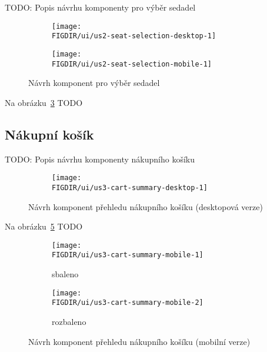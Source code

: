 TODO: Popis návrhu komponenty pro výběr sedadel

\begin{figure}[H]
    \centering
    \begin{subfigure}{0.775\textwidth}
        \texttt{[image: \\FIGDIR/ui/us2-seat-selection-desktop-1]}
        \label{fig:us2-seat-selection-desktop-1}
    \end{subfigure}
    \begin{subfigure}{0.2\textwidth}
        \texttt{[image: \\FIGDIR/ui/us2-seat-selection-mobile-1]}
        \label{fig:us2-seat-selection-mobile-1}
    \end{subfigure}
    \caption{Návrh komponent pro výběr sedadel}
    \label{fig:us2-seat-selection}
\end{figure}

Na obrázku~\ref{fig:us2-seat-selection} TODO

\subsection{Nákupní košík}
\label{subsec:narvh-ui-transformace-uzivatelskych-pribehu-nakupni-kosik}
\userstoryshoppingcart

TODO: Popis návrhu komponenty nákupního košíku

\begin{figure}[H]
    \centering
    \begin{subfigure}{\textwidth}
        \texttt{[image: \\FIGDIR/ui/us3-cart-summary-desktop-1]}
        \label{fig:uus3-cart-summary-desktop-1}
    \end{subfigure}
    \caption{Návrh komponent přehledu nákupního košíku (desktopová verze)}
    \label{fig:us3-cart-summary-desktop}
\end{figure}

Na obrázku~\ref{fig:us3-cart-summary-desktop} TODO

\begin{figure}[H]
    \centering
    \begin{subfigure}{0.4\textwidth}
        \texttt{[image: \\FIGDIR/ui/us3-cart-summary-mobile-1]}
        \caption{sbaleno}
        \label{fig:us3-cart-summary-mobile-1}
    \end{subfigure}
    \hfill
    \begin{subfigure}{0.4\textwidth}
        \texttt{[image: \\FIGDIR/ui/us3-cart-summary-mobile-2]}
        \caption{rozbaleno}
        \label{fig:us3-cart-summary-mobile-2}
    \end{subfigure}

    \caption{Návrh komponent přehledu nákupního košíku (mobilní verze)}
    \label{fig:us3-cart-summary-mobile}
\end{figure}

